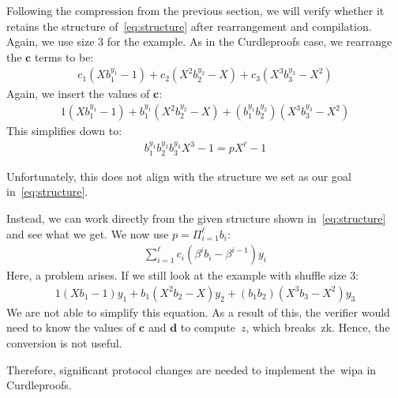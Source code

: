 Following the compression from the previous section, we will verify whether it retains the structure of~\autoref{eq:structure} after rearrangement and compilation.
Again, we use size 3 for the example.
As in the Curdleproofs case, we rearrange the $\mathbf{c}$ terms to be:
\begin{align}
    c_1(X b_1^{y_1}-1)+c_2(X^2 b_2^{y_2}-X)+c_3(X^3 b_3^{y_3}-X^2)
\end{align}
Again, we insert the values of $\mathbf{c}$:
\begin{align}
    1(X b_1^{y_1}-1)+b_1^{y_1}(X^2 b_2^{y_2}-X)+(b_1^{y_1}b_2^{y_2})(X^3 b_3^{y_3}-X^2)
\end{align}
This simplifies down to:
\begin{align}
    b_1^{y_1}b_2^{y_2}b_3^{y_3}X^3-1=pX^{\ell}-1
\end{align}

Unfortunately, this does not align with the structure we set as our goal in~\autoref{eq:structure}.

Instead, we can work directly from the given structure shown in~\autoref{eq:structure} and see what we get.
We now use $p=\Pi_{i=1}^\ell b_i$:
\begin{align}
    \sum_{i=1}^{\ell}c_i(\beta^{i}b_i-\beta^{i-1})y_i
\end{align}
Here, a problem arises.
If we still look at the example with shuffle size 3:
\begin{align}
    1(Xb_1-1)y_1+b_1(X^2b_2-X)y_2+(b_1b_2)(X^3b_3-X^2)y_3
\end{align}
We are not able to simplify this equation.
As a result of this, the verifier would need to know the values of $\mathbf{c}$ and $\mathbf{d}$ to compute~$z$, which breaks~\gls{zk}.
Hence, the conversion is not useful.

Therefore, significant protocol changes are needed to implement the~\gls{wipa} in Curdleproofs.